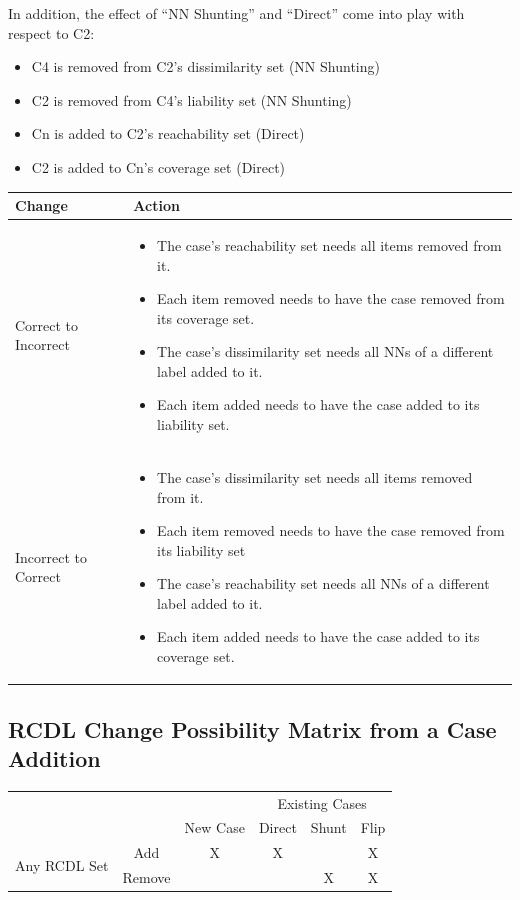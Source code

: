 \documentclass[a4paper,11pt]{report}
\begin{document}
In addition, the effect of ``NN Shunting'' and ``Direct'' come into play with respect to C2:
\begin{itemize}
	\item C4 is removed from C2's dissimilarity set (NN Shunting)
	\item C2 is removed from C4's liability set (NN Shunting)
	\item Cn is added to C2's reachability set (Direct)
	\item C2 is added to Cn's coverage set (Direct)
\end{itemize}

\begin{tabular}{|x{55pt}|x{355pt}|}
\hline 
Change & Action \tabularnewline 
\hline 
Correct to Incorrect & 
\begin{itemize}
	\item The case's reachability set needs all items removed from it.
	\item Each item removed needs to have the case removed from its coverage set.
	\item The case's dissimilarity set needs all NNs of a different label added to it.
	\item Each item added needs to have the case added to its liability set.
\end{itemize} \tabularnewline 
\hline 
Incorrect to Correct & 
\begin{itemize}
	\item The case's dissimilarity set needs all items removed from it.
	\item Each item removed needs to have the case removed from its liability set
	\item The case's reachability set needs all NNs of a different label added to it.
	\item Each item added needs to have the case added to its coverage set.
\end{itemize} \tabularnewline 
\hline 
\end{tabular}	

\subsection{RCDL Change Possibility Matrix from a Case Addition\label{sec:rcdlchangematrix}}
\begin{tabular}{|c|c|c|c|c|c|}
\cline{4-6} 
\multicolumn{1}{c}{} & \multicolumn{1}{c}{} &  & \multicolumn{3}{c|}{Existing Cases}\tabularnewline
\cline{3-6} 
\multicolumn{1}{c}{} &  & New Case & Direct & Shunt & Flip\tabularnewline
\hline
\multirow{2}{*}{Any RCDL Set} & Add & X & X &  & X\tabularnewline
\cline{2-6} 
 & Remove &  &  & X & X\tabularnewline
\hline 
\end{tabular}
\end{document}
